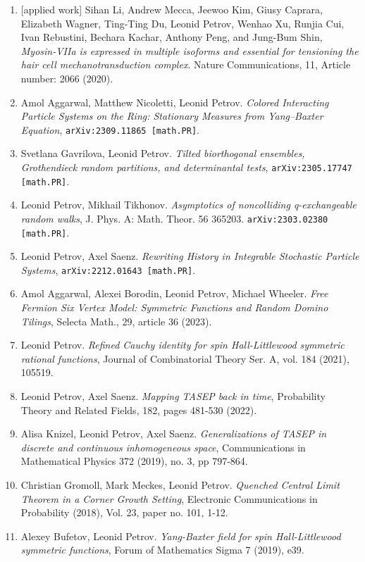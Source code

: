 \documentclass{amsart}
\begin{document}
\begin{enumerate}
\item 
{[applied work]}
Sihan Li, Andrew Mecca, Jeewoo Kim, Giusy Caprara, Elizabeth Wagner, Ting-Ting Du, Leonid Petrov, Wenhao Xu, Runjia Cui, Ivan Rebustini, Bechara Kachar, Anthony Peng, and Jung-Bum Shin,
\emph{Myosin-VIIa is expressed in multiple isoforms and essential for tensioning the hair cell mechanotransduction complex}.
Nature Communications, 11, Article number: 2066 (2020). 
\item  Amol Aggarwal, Matthew Nicoletti, Leonid Petrov. \emph{Colored Interacting Particle Systems on the Ring: Stationary Measures from Yang--Baxter Equation}, \texttt{arXiv:2309.11865 [math.PR]}.
\item Svetlana Gavrilova, Leonid Petrov. \emph{Tilted biorthogonal ensembles, Grothendieck random partitions, and determinantal tests}, \texttt{arXiv:2305.17747 [math.PR]}.
\item Leonid Petrov, Mikhail Tikhonov. \emph{Asymptotics of noncolliding q-exchangeable random walks}, J. Phys. A: Math. Theor. 56 365203. \texttt{arXiv:2303.02380 [math.PR]}.
\item Leonid Petrov, Axel Saenz. \emph{Rewriting History in Integrable Stochastic Particle Systems}, \texttt{arXiv:2212.01643 [math.PR]}.
\item Amol Aggarwal, Alexei Borodin, Leonid Petrov, Michael Wheeler. \emph{Free Fermion Six Vertex Model: Symmetric Functions and Random Domino Tilings}, Selecta Math., 29, article 36 (2023).
\item Leonid Petrov. \emph{Refined Cauchy identity for spin Hall-Littlewood symmetric rational functions}, Journal of Combinatorial Theory Ser. A, vol. 184 (2021), 105519.
\item Leonid Petrov, Axel Saenz. \emph{Mapping TASEP back in time}, Probability Theory and Related Fields, 182, pages 481-530 (2022).
\item Alisa Knizel, Leonid Petrov, Axel Saenz. \emph{Generalizations of TASEP in discrete and continuous inhomogeneous space}, Communications in Mathematical Physics 372 (2019), no. 3, pp 797-864.
\item Christian Gromoll, Mark Meckes, Leonid Petrov. \emph{Quenched Central Limit Theorem in a Corner Growth Setting}, Electronic Communications in Probability (2018), Vol. 23, paper no. 101, 1-12.
\item Alexey Bufetov, Leonid Petrov. \emph{Yang-Baxter field for spin Hall-Littlewood symmetric functions}, Forum of Mathematics Sigma 7 (2019), e39.

\end{enumerate}
\end{document}
